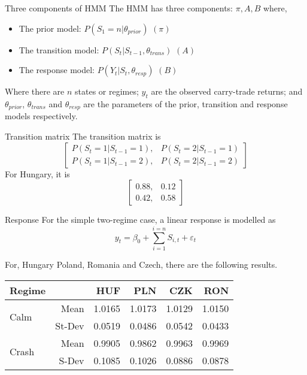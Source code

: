 \documentclass[14pt,xcolor=pdftex,dvipsnames,table]{beamer}
\begin{document}
\begin{frame}{Three components of HMM}
The HMM has three components: $\pi, A, B$ where,
\begin{itemize}[<+-| alert@+>]
\item The prior model: $P(S_1 = n| \theta_{prior})$ $(\pi)$
\item The transition model: $P(S_t| S_{t-1}, \theta_{trans})$ $(A)$
\item The response model: $P(Y_t| S_t, \theta_{resp})$ $(B)$
\end{itemize}
\pause
Where there are $n$ states or regimes; $y_t$ are the observed carry-trade returns; and $\theta_{prior}$, $\theta_{trans}$ and  $\theta_{resp}$ are the parameters of the prior, transition and response models respectively.
\end{frame}

\begin{frame}{Transition matrix}
The transition matrix is
\begin{equation*}
\begin{bmatrix}
P(S_t = 1|S_{t-1}=1),  & P(S_t = 2|S_{t-1}=1)\\
P(S_t = 1|S_{t-1}=2),  & P(S_t = 2|S_{t-1}=2)
\end{bmatrix}
\end{equation*}
For Hungary, it is 
\begin{equation*}
\begin{bmatrix}
0.88,  & 0.12\\
0.42,  & 0.58
\end{bmatrix}
\end{equation*}
\end{frame}

\begin{frame}{Response}
For the simple two-regime case, a linear response is modelled as
\begin{equation*}
y_t = \beta_0 + \sum_{i=1}^{i=n}S_{i,t} + \varepsilon_t
\end{equation*}

For, Hungary Poland, Romania and Czech, there are the following results. 
\begin{center}
 \begin{tabular}{lrrrrr}
  \hline
 Regime& & HUF & PLN & CZK & RON \\ 
  \hline
   \multirow{2}{*}[5pt]{Calm}& Mean & 1.0165 & 1.0173 & 1.0129 & 1.0150 \\ 
&St-Dev& 0.0519 & 0.0486 & 0.0542 & 0.0433  \\ 
\hline
\multirow{2}{*}[5pt]{Crash}& Mean & 0.9905 & 0.9862 & 0.9963 & 0.9969  \\ 
 &S-Dev & 0.1085 & 0.1026 & 0.0886 & 0.0878 
\end{tabular}
\end{center}
\end{frame}
\end{document}
